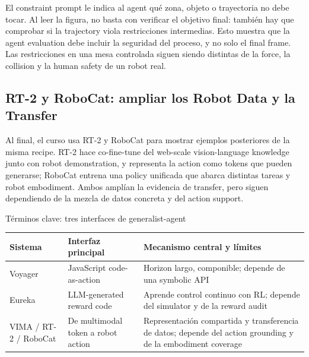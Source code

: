 
El constraint prompt le indica al agent qué zona, objeto o trayectoria no debe tocar. Al leer la figura, no basta con verificar el objetivo final: también hay que comprobar si la trajectory viola restricciones intermedias. Esto muestra que la agent evaluation debe incluir la seguridad del proceso, y no solo el final frame. Las restricciones en una mesa controlada siguen siendo distintas de la force, la collision y la human safety de un robot real.


\subsection{RT-2 y RoboCat: ampliar los Robot Data y la Transfer}

Al final, el curso usa RT-2 y RoboCat para mostrar ejemplos posteriores de la misma recipe. RT-2 hace co-fine-tune del web-scale vision-language knowledge junto con robot demonstration, y representa la action como tokens que pueden generarse; RoboCat entrena una policy unificada que abarca distintas tareas y robot embodiment. Ambos amplían la evidencia de transfer, pero siguen dependiendo de la mezcla de datos concreta y del action support.


\begin{knowledgebox}{Términos clave: tres interfaces de generalist-agent}
\begin{tabularx}{\textwidth}{@{}L{0.17\textwidth}L{0.25\textwidth}X@{}}
\toprule
Sistema & Interfaz principal & Mecanismo central y límites \\
\midrule
Voyager & JavaScript code-as-action & Horizon largo, componible; depende de una symbolic API \\
Eureka & LLM-generated reward code & Aprende control continuo con RL; depende del simulator y de la reward audit \\
VIMA / RT-2 / RoboCat & De multimodal token a robot action & Representación compartida y transferencia de datos; depende del action grounding y de la embodiment coverage \\
\bottomrule
\end{tabularx}
\end{knowledgebox}

